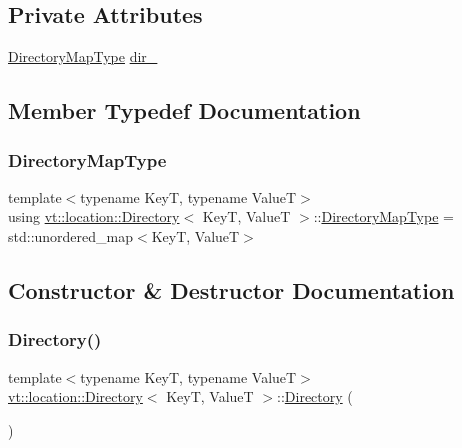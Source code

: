 \subsection*{Private Attributes}
\begin{DoxyCompactItemize}
\item 
\hyperlink{structvt_1_1location_1_1_directory_a6a897ff3929eccb2d334eb0b87b53f57}{Directory\+Map\+Type} \hyperlink{structvt_1_1location_1_1_directory_a8febd5f13d21274bce41021ba2a3da03}{dir\+\_\+}
\end{DoxyCompactItemize}


\subsection{Member Typedef Documentation}
\mbox{\label{structvt_1_1location_1_1_directory_a6a897ff3929eccb2d334eb0b87b53f57}} 
\subsubsection{\texorpdfstring{Directory\+Map\+Type}{DirectoryMapType}}
{\footnotesize\ttfamily template$<$typename KeyT, typename ValueT$>$ \\
using \hyperlink{structvt_1_1location_1_1_directory}{vt\+::location\+::\+Directory}$<$ KeyT, ValueT $>$\+::\hyperlink{structvt_1_1location_1_1_directory_a6a897ff3929eccb2d334eb0b87b53f57}{Directory\+Map\+Type} =  std\+::unordered\+\_\+map$<$KeyT, ValueT$>$}



\subsection{Constructor \& Destructor Documentation}
\mbox{\label{structvt_1_1location_1_1_directory_a166cb46d3274d1bc09e4b852d70172af}} 
\subsubsection{\texorpdfstring{Directory()}{Directory()}}
{\footnotesize\ttfamily template$<$typename KeyT, typename ValueT$>$ \\
\hyperlink{structvt_1_1location_1_1_directory}{vt\+::location\+::\+Directory}$<$ KeyT, ValueT $>$\+::\hyperlink{structvt_1_1location_1_1_directory}{Directory} (\begin{DoxyParamCaption}{ }\end{DoxyParamCaption})\hspace{0.3cm}{\ttfamily [default]}}



